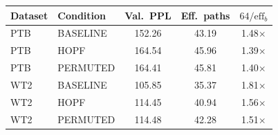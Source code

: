 \begin{tabular}{llccc}
\toprule
Dataset & Condition & Val.\ PPL & Eff.\ paths & $64/\mathrm{eff}_b$ \\
\midrule
PTB & BASELINE & 152.26 & 43.19 & 1.48$\times$ \\
PTB & HOPF & 164.54 & 45.96 & 1.39$\times$ \\
PTB & PERMUTED & 164.41 & 45.81 & 1.40$\times$ \\
\midrule
WT2 & BASELINE & 105.85 & 35.37 & 1.81$\times$ \\
WT2 & HOPF & 114.45 & 40.94 & 1.56$\times$ \\
WT2 & PERMUTED & 114.48 & 42.28 & 1.51$\times$ \\
\bottomrule
\end{tabular}

